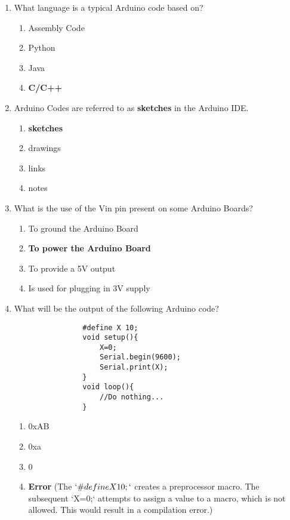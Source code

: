 \documentclass[a4paper,12pt]{article}
\begin{document}
\begin{enumerate}
			\item What language is a typical Arduino code based on?
			\begin{enumerate}
				\item Assembly Code
				\item Python
				\item Java
				\item \textbf{C/C++}
			\end{enumerate}
			
			\item Arduino Codes are referred to as \textbf{sketches} in the Arduino IDE.
			\begin{enumerate}
				\item \textbf{sketches}
				\item drawings
				\item links
				\item notes
			\end{enumerate}
			
			\item What is the use of the Vin pin present on some Arduino Boards?
			\begin{enumerate}
				\item To ground the Arduino Board
				\item \textbf{To power the Arduino Board}
				\item To provide a 5V output
				\item Is used for plugging in 3V supply
			\end{enumerate}
			
			\item What will be the output of the following Arduino code?
			\begin{verbatim}
				#define X 10;
				void setup(){
					X=0;
					Serial.begin(9600);
					Serial.print(X);
				}
				void loop(){
					//Do nothing...
				}
			\end{verbatim}
			\begin{enumerate}
				\item 0xAB
				\item 0xa
				\item 0
				\item \textbf{Error} (The $`\# define X 10;`$ creates a preprocessor macro. The subsequent `X=0;` attempts to assign a value to a macro, which is not allowed. This would result in a compilation error.)
			\end{enumerate}
	
	
		

\end{enumerate}
\end{document}
